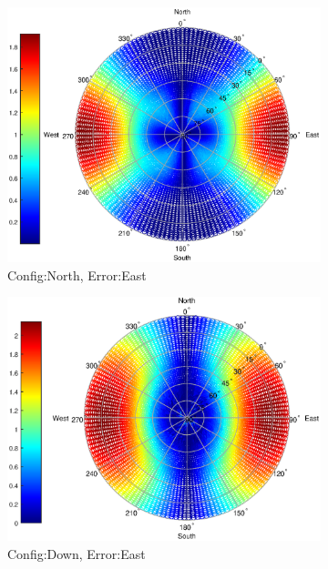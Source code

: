 \begin{figure}
\begin{subfigure}[t]{0.49\linewidth}
\end{subfigure}
\begin{subfigure}[t]{0.49\textwidth}
\centering
\caption{Config:North, Error:East}
\includegraphics[width =\linewidth]{ChapterExperiments/Figures/plane_Eeast_north_pow4}
\end{subfigure}
\begin{subfigure}[t]{0.49\linewidth}
\centering
\caption{Config:Down, Error:East}
\includegraphics[width = \linewidth]{ChapterExperiments/Figures/plane_Eeast_down_pow4}
\end{subfigure}
\begin{subfigure}[t]{0.49\textwidth}

\end{subfigure}
\end{figure}
